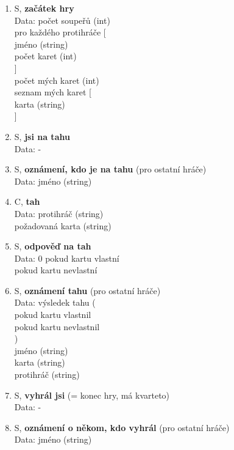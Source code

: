 \documentclass[12pt, a4paper]{article}
\begin{document}
\begin{enumerate}
		\item S, \textbf{začátek hry}\\
		Data: počet soupeřů (int)\\
			\null \quad pro každého protihráče [\\
			\null \qquad jméno (string)\\
			\null \qquad počet karet (int)\\
			\null \quad ]\\
			\null \quad počet mých karet (int)\\
			\null \quad seznam mých karet [\\
			\null \qquad karta (string)\\
			\null \quad ]
		
		\item S, \textbf{jsi na tahu}\\
		Data: -
		
		\item S, \textbf{oznámení, kdo je na tahu} (pro ostatní hráče)\\
		Data: jméno (string)
		
		\item C, \textbf{tah}\\
		Data: protihráč (string)\\
			\null \quad požadovaná karta (string)

		\item S, \textbf{odpověď na tah}\\
		Data: 0 pokud kartu vlastní\\
			\null {} pokud kartu nevlastní

		\item S, \textbf{oznámení tahu} (pro ostatní hráče)\\
		Data: výsledek tahu (\\
			\null {} pokud kartu vlastnil\\
			\null {} pokud kartu nevlastnil\\
			\null \quad )\\
			\null \quad jméno (string)\\
			\null \quad karta (string)\\
			\null \quad protihráč (string)

		\item S, \textbf{vyhrál jsi} (= konec hry, má kvarteto)\\
		Data: -

		\item S, \textbf{oznámení o někom, kdo vyhrál} (pro ostatní hráče)\\
		Data: jméno (string)


\end{enumerate}
\end{document}
